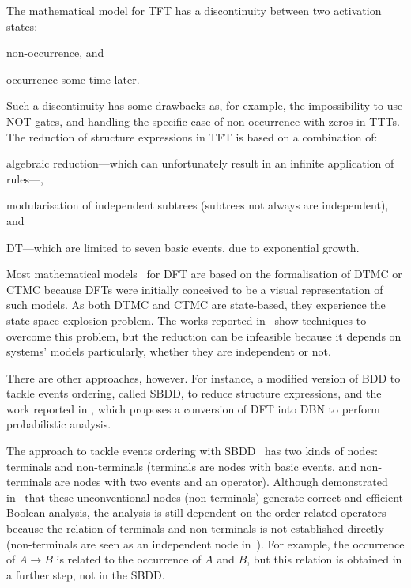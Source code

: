 The mathematical model for \ac{TFT} has a discontinuity between two activation states:
\begin{alineasinline}
  \item non-occurrence, and
  \item occurrence some time later.
\end{alineasinline}
Such a discontinuity has some drawbacks as, for example, the impossibility to use \ac{NOT} gates, and handling the specific case of non-occurrence with zeros in \acp{TTT}.
The reduction of structure expressions in \ac{TFT} is based on a combination of:
\begin{alineasinline}
  \item algebraic reduction---which can unfortunately result in an infinite application of rules---,
  \item modularisation of independent subtrees (subtrees not always are independent), and
  \item \ac{DT}---which are limited to seven basic events, due to exponential growth.
\end{alineasinline}


\begin{sloppypar}
Most mathematical models~\cite{LHT2013,CSD2000,BRM+2005} for \ac{DFT} are based on the formalisation of \ac{DTMC} or \ac{CTMC} because \acp{DFT} were initially conceived to be a visual representation of such models.
As both \ac{DTMC} and \ac{CTMC} are state-based, they experience the state-space explosion problem.
The works reported in~\cite{BKK+2003,BHH+2003,SAE1996b} show techniques to overcome this problem, but the reduction can be infeasible because it depends on systems' models particularly, whether they are independent or not.
\end{sloppypar}

There are other approaches, however.
For instance, a modified version of \ac{BDD} to tackle events ordering, called \acf{SBDD}, to reduce structure expressions, and the work reported in \cite{BRM+2005}, which proposes a conversion of \ac{DFT} into \ac{DBN} to perform probabilistic analysis.

The approach to tackle events ordering with \ac{SBDD}~\cite{XTD2012} has two kinds of nodes: terminals and non-terminals (terminals are nodes with basic events, and non-terminals are nodes with two events and an operator).
Although demonstrated in~\cite{Bryant1986} that these unconventional nodes (non-terminals) generate correct and efficient Boolean analysis, the analysis is still dependent on the order-related operators because the relation of terminals and non-terminals is not established directly (non-terminals are seen as an independent node in~\cite{XTD2012}).
For example, the occurrence of $A \rightarrow B$ is related to the occurrence of $A$ and $B$, but this relation is obtained in a further step, not in the \ac{SBDD}.

